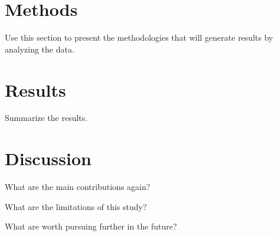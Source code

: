 \documentclass[12pt]{article}
\begin{document}
\section{Methods}
\label{sec:meth}

Use this section to present the methodologies that will generate results by
analyzing the data.


\section{Results}
\label{sec:resu}

Summarize the results.


\section{Discussion}
\label{sec:disc}

What are the main contributions again?

What are the limitations of this study?

What are worth pursuing further in the future?




\end{document}
